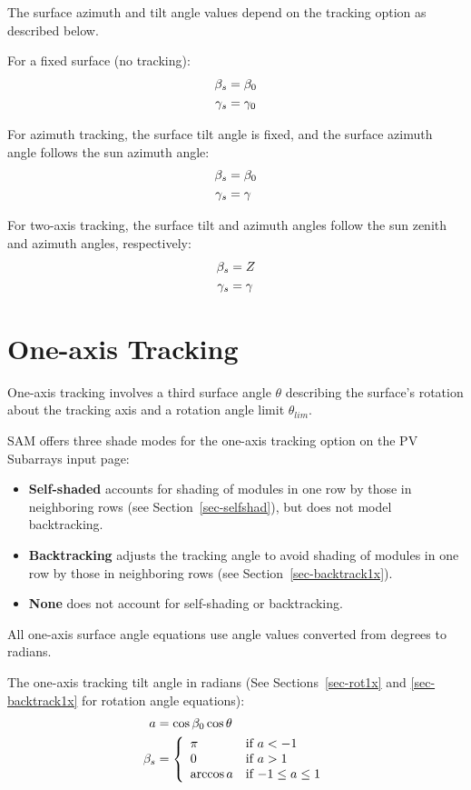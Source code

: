 \documentclass[12pt,letterpaper]{article}
\begin{document}
The surface azimuth and tilt angle values depend on the tracking option as described below.

For a fixed surface (no tracking):
\begin{align}\label{eqn-fxtilt}
\beta_s &= \beta_0 \notag\\
\gamma_s &= \gamma_0
\end{align}

For azimuth tracking, the surface tilt angle is fixed, and the surface azimuth angle follows the sun azimuth angle:
\begin{align}\label{eqn-aztilt}
\beta_s &= \beta_0 \notag\\
\gamma_s &= \gamma
\end{align}

For two-axis tracking, the surface tilt and azimuth angles follow the sun zenith and azimuth angles, respectively:
\begin{align}\label{eqn-2xtilt}
\beta_s & = Z \notag\\
\gamma_s & = \gamma
\end{align}

\section{One-axis Tracking}

One-axis tracking involves a third surface angle $\theta$ describing the surface's rotation about the tracking axis and a rotation angle limit $\theta_{lim}$. 

SAM offers three shade modes for the one-axis tracking option on the PV Subarrays input page:
\begin{itemize}
\item \textbf{Self-shaded} accounts for shading of modules in one row by those in neighboring rows (see Section~\ref{sec-selfshad}), but does not model backtracking.
\item \textbf{Backtracking} adjusts the tracking angle to avoid shading of modules in one row by those in neighboring rows (see Section~\ref{sec-backtrack1x}).
\item \textbf{None} does not account for self-shading or backtracking.
\end{itemize}

All one-axis surface angle equations use angle values converted from degrees to radians.

The one-axis tracking tilt angle in radians (See Sections~\ref{sec-rot1x} and \ref{sec-backtrack1x} for rotation angle equations):
\begin{align}
a & = \cos\beta_0 \cos\theta\notag\\
\beta_s &= \left\{
\begin{array}{ll}
\pi & \text{if $a<-1$}\\
0 & \text{if $a>1$}\\
\arccos a & \text{if $-1 \leq a \leq 1$}
\end{array}
\right.
\end{align}
\end{document}
